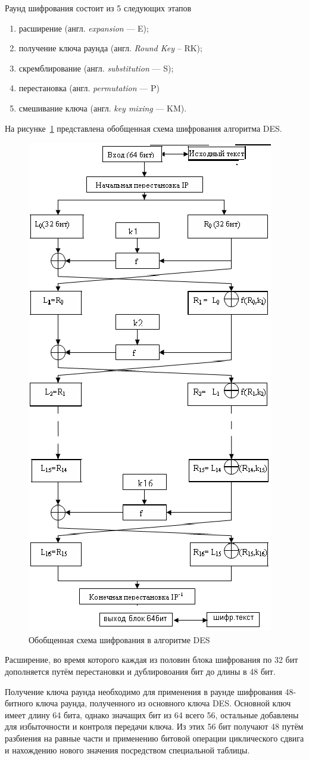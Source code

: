 Раунд шифрования состоит из 5 следующих этапов
\begin{enumerate}[label=\arabic*)]
	\item расширение (англ. \textit{expansion} --- E);
	\item получение ключа раунда (англ. \textit{Round Key} -- RK);
	\item скремблирование (англ. \textit{substitution} --- S);
	\item перестановка (англ. \textit{permutation} --- P)
	\item смешивание ключа (англ. \textit{key mixing} --- KM).
\end{enumerate}

На рисунке~\ref{fig:des} представлена обобщенная схема шифрования алгоритма DES.

\begin{figure}[ht!]
	\centering
	\includegraphics[width=0.4\linewidth]{images/des_scheme.png}
	\caption{Обобщенная схема шифрования в алгоритме DES}
	\label{fig:des}
\end{figure}

Расширение, во время которого каждая из половин блока шифрования по 32 бит дополняется путём перестановки и дублировоания бит до длины в 48 бит.

Получение ключа раунда необходимо для применения в раунде шифрования 48-битного ключа раунда, полученного из основного ключа DES. Основной ключ имеет длину 64 бита, однако значащих бит из 64 всего 56, остальные добавлены для избыточности и контроля передачи ключа. Из этих 56 бит получают 48 путём разбиения на равные части и применению битовой операции циклического сдвига и нахождению нового значения посредством специальной таблицы.

